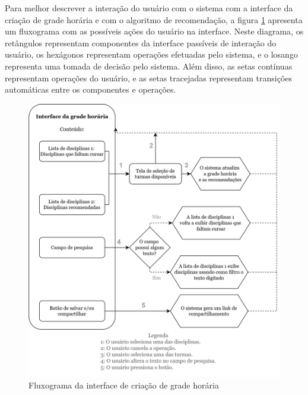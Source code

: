 Para melhor descrever a interação do usuário com o sistema com a interface da criação de grade horária e com o algoritmo de recomendação, a figura \ref{fig:fluxograma-grade} apresenta um fluxograma com as possíveis ações do usuário na interface. Neste diagrama, os retângulos representam componentes da interface passíveis de interação do usuário, os hexágonos representam operações efetuadas pelo sistema, e o losango representa uma tomada de decisão pelo sistema. Além disso, as setas contínuas representam operações do usuário, e as setas tracejadas representam transições automáticas entre os componentes e operações. 

\begin{figure}[ht]
    \begin{center}
    \includegraphics[width=390pt]{figuras/fluxograma-grade.png}
    \caption{Fluxograma da interface de criação de grade horária}
    \label{fig:fluxograma-grade}
    \end{center}
\end{figure}